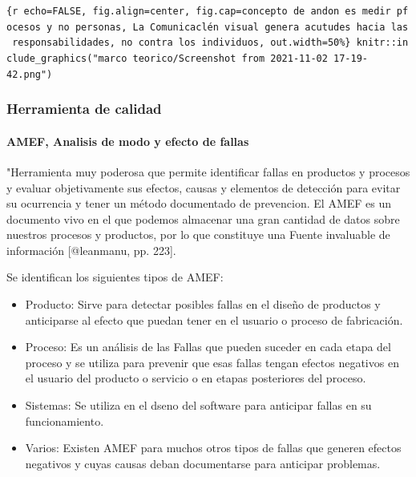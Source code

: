 \documentclass[11pt]{article}
\providecommand{\tightlist}{%
      \setlength{\itemsep}{0pt}\setlength{\parskip}{0pt}}
\begin{document}
\texttt{\{r\ echo=FALSE,\ fig.align=\textquotesingle{}center\textquotesingle{},\ fig.cap=\textquotesingle{}concepto\ de\ andon\ es\ medir\ pfocesos\ y\ no\ personas,\ La\ Comunicaclén\ visual\ genera\ acutudes\ hacia\ las\ responsabilidades,\ no\ contra\ los\ individuos\textquotesingle{},\ out.width=\textquotesingle{}50\%\textquotesingle{}\}\ knitr::include\_graphics("marco\ teorico/Screenshot\ from\ 2021-11-02\ 17-19-42.png")}

\hypertarget{herramienta-de-calidad}{%
\subsubsection{Herramienta de calidad}\label{herramienta-de-calidad}}

\hypertarget{amef-analisis-de-modo-y-efecto-de-fallas}{%
\paragraph{AMEF, Analisis de modo y efecto de
fallas}\label{amef-analisis-de-modo-y-efecto-de-fallas}}

"Herramienta muy poderosa que permite identificar fallas en productos y
procesos y evaluar objetivamente sus efectos, causas y elementos de
detección para evitar su ocurrencia y tener un método documentado de
prevencion. El AMEF es un documento vivo en el que podemos almacenar una
gran cantidad de datos sobre nuestros procesos y productos, por lo que
constituye una Fuente invaluable de información {[}@leanmanu, pp.
223{]}.

Se identifican los siguientes tipos de AMEF:

\begin{itemize}
\tightlist
\item
  Producto: Sirve para detectar posibles fallas en el diseño de
  productos y anticiparse al efecto que puedan tener en el usuario o
  proceso de fabricación.
\item
  Proceso: Es un análisis de las Fallas que pueden suceder en cada etapa
  del proceso y se utiliza para prevenir que esas fallas tengan efectos
  negativos en el usuario del producto o servicio o en etapas
  posteriores del proceso.
\item
  Sistemas: Se utiliza en el d\textbar{}seno del software para anticipar
  fallas en su funcionamiento.
\item
  Varios: Existen AMEF para muchos otros tipos de fallas que generen
  efectos negativos y cuyas causas deban documentarse para anticipar
  problemas.
\end{itemize}
\end{document}
